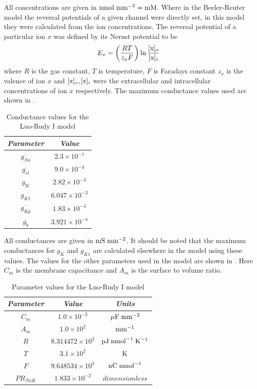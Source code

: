 All concentrations are given in $\mathrm{nmol}\thickspace\mathrm{mm}^{-3}=\mathrm{mM}$. Where in the
Beeler-Reuter model the reversal potentials of a given channel were
directly set, in this model they were calculated from the ion concentrations. The
reversal potential of a particular ion $x$ was defined by its Nernst potential to be 
\begin{equation}
  E_{x}=\left( \dfrac{RT}{z_xF} \right)\ln{\dfrac{\ensuremath{ [\mathrm{x}]_{o} }}{\ensuremath{ [\mathrm{x}]_{i} }}}
  \label{eqn:lr1reversal}
\end{equation}
where $R$ is the gas constant, $T$ is temperature, $F$ is Faradays constant
$z_x$ is the valence of ion $x$ and $ [\mathrm{x}]_{o} $,$ [\mathrm{x}]_{i} $ were the
extracellular and intracellular 
concentrations of ion $x$ respectively. The maximum conductance values used
are shown in .  
\begin{table}[hbtp] \centering
  \begin{tabular}{|c|c|}
    \hline
    \emph{Parameter} & \emph{Value} \\ 
    \hline
    \hline 
      $\overline{g_{Na}}$ & $2.3 \times 10^{-1}$ \\
      $\overline{g_{si}}$ & $9.0 \times 10^{-4}$ \\
      $g_{K}$ & $2.82 \times 10^{-3}$ \\
      $g_{K1}$ & $6.047 \times 10^{-3}$ \\
      $\overline{g_{Kp}}$ & $1.83 \times 10^{-4}$ \\
      $\overline{g_{b}}$ & $3.921 \times 10^{-4}$ \\
    \hline
  \end{tabular}
  \caption[Conductance values for the Luo-Rudy I model]{Conductance
    values for the Luo-Rudy I model}
  \label{tab:lr1_conductance}
\end{table}
All conductances are given in $\mathrm{mS}\thickspace\mathrm{mm}^{-2}$. It should be noted
that the maximum conductances for $g_{K}$ and $g_{K1}$ are calculated
elsewhere in the model using these values. The values for the other parameters
used in the model are shown in . Here $C_m$ is the
membrane capacitance and $A_m$ is the surface to volume 
ratio. 
\begin{table}[hbtp] \centering
  \begin{tabular}{|c|c|c|}
    \hline
    \emph{Parameter} & \emph{Value} & \emph{Units}\\ 
    \hline
    \hline 
      $C_m$ & $1.0 \times 10^{-2}$ & $\mathrm{\mu F}\thickspace\mathrm{mm}^{-2}$ \\
      $A_m$ & $1.0 \times 10^{2}$  & $\mathrm{\mathrm{mm}^{-1}}$ \\
      $R$ & $8.314472 \times 10^{3}$ & $\mathrm{pJ}\thickspace
      \mathrm{nmol}^{-1}\thickspace \mathrm{K}^{-1}$ \\
      $T$ & $3.1 \times 10^{2}$ & $\mathrm{K}$\\
      $F$ & $9.648534 \times 10^{4}$ & $\mathrm{nC}\thickspace\mathrm{nmol}^{-1}$ \\
      $PR_{NaK}$ & $1.833 \times 10^{-2}$ & $dimensionless$ \\
    \hline
  \end{tabular}
  \caption[Parameter values for the Luo-Rudy I model]{Parameter
    values for the Luo-Rudy I model}
  \label{tab:lr1_params}
\end{table}
